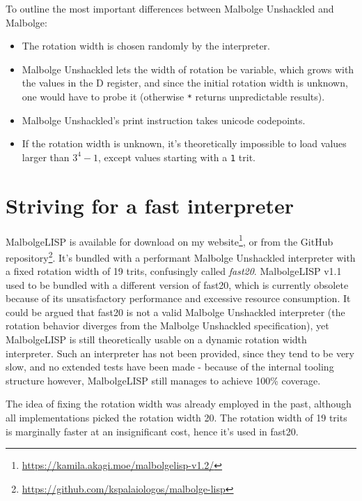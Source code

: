 \par To outline the most important differences between Malbolge Unshackled and Malbolge:

\begin{itemize}
    \item The rotation width is chosen randomly by the interpreter.
    \item Malbolge Unshackled lets the width of rotation be variable, which grows with the values in the D register, and since the initial rotation width is unknown, one would have to probe it (otherwise \verb|*| returns unpredictable results).
    \item Malbolge Unshackled's print instruction takes unicode codepoints.
    \item If the rotation width is unknown, it's theoretically impossible to load values larger than $3^4-1$, except values starting with a \verb|1| trit.
\end{itemize}

\section{Striving for a fast interpreter}

\par MalbolgeLISP is available for download on my website\footnote{\url{https://kamila.akagi.moe/malbolgelisp-v1.2/}}, or from the GitHub repository\footnote{\url{https://github.com/kspalaiologos/malbolge-lisp}}. It's bundled with a performant Malbolge Unshackled interpreter with a fixed rotation width of 19 trits, confusingly called \textit{fast20}. MalbolgeLISP v1.1 used to be bundled with a different version of fast20, which is currently obsolete because of its unsatisfactory performance and excessive resource consumption. It could be argued that fast20 is not a valid Malbolge Unshackled interpreter (the rotation behavior diverges from the Malbolge Unshackled specification), yet MalbolgeLISP is still theoretically usable on a dynamic rotation width interpreter. Such an interpreter has not been provided, since they tend to be very slow, and no extended tests have been made - because of the internal tooling structure however, MalbolgeLISP still manages to achieve 100\% coverage.

\par The idea of fixing the rotation width was already employed in the past, although all implementations picked the rotation width 20. The rotation width of 19 trits is marginally faster at an insignificant cost, hence it's used in fast20.

